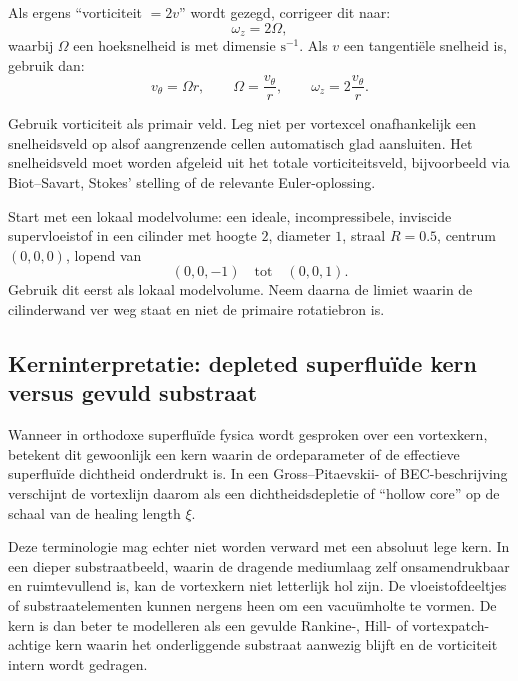 \documentclass[11pt]{article}
\begin{document}
        Als ergens ``vorticiteit \(=2v\)'' wordt gezegd, corrigeer dit naar:
        \[
            \omega_z=2\Omega,
        \]
        waarbij \(\Omega\) een hoeksnelheid is met dimensie \(\mathrm{s^{-1}}\).
        Als \(v\) een tangentiële snelheid is, gebruik dan:
        \[
            v_{\theta}=\Omega r,
            \qquad
            \Omega=\frac{v_{\theta}}{r},
            \qquad
            \omega_z=2\frac{v_{\theta}}{r}.
        \]
        
        Gebruik vorticiteit als primair veld. Leg niet per vortexcel onafhankelijk een snelheidsveld op alsof aangrenzende cellen automatisch glad aansluiten. Het snelheidsveld moet worden afgeleid uit het totale vorticiteitsveld, bijvoorbeeld via Biot--Savart, Stokes' stelling of de relevante Euler-oplossing.
        
        Start met een lokaal modelvolume: een ideale, incompressibele, inviscide supervloeistof in een cilinder met hoogte \(2\), diameter \(1\), straal \(R=0.5\), centrum \((0,0,0)\), lopend van
        \[
            (0,0,-1)
            \quad\text{tot}\quad
            (0,0,1).
        \]
        Gebruik dit eerst als lokaal modelvolume. Neem daarna de limiet waarin de cilinderwand ver weg staat en niet de primaire rotatiebron is.
    
    \subsection*{Kerninterpretatie: depleted superfluïde kern versus gevuld substraat}
        
        Wanneer in orthodoxe superfluïde fysica wordt gesproken over een vortexkern, betekent dit gewoonlijk een kern waarin de ordeparameter of de effectieve superfluïde dichtheid onderdrukt is. In een Gross--Pitaevskii- of BEC-beschrijving verschijnt de vortexlijn daarom als een dichtheidsdepletie of ``hollow core'' op de schaal van de healing length \(\xi\).
        
        Deze terminologie mag echter niet worden verward met een absoluut lege kern. In een dieper substraatbeeld, waarin de dragende mediumlaag zelf onsamendrukbaar en ruimtevullend is, kan de vortexkern niet letterlijk hol zijn. De vloeistofdeeltjes of substraatelementen kunnen nergens heen om een vacuümholte te vormen. De kern is dan beter te modelleren als een gevulde Rankine-, Hill- of vortexpatch-achtige kern waarin het onderliggende substraat aanwezig blijft en de vorticiteit intern wordt gedragen.
        
\end{document}
